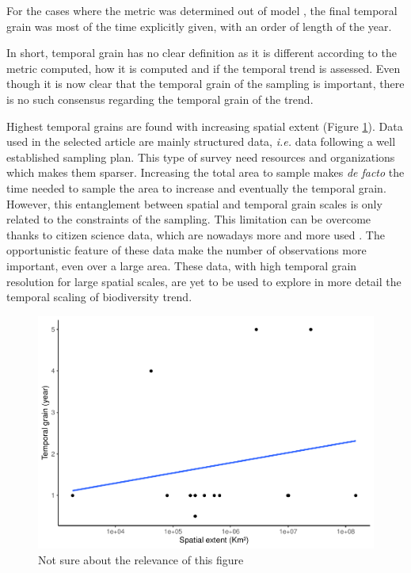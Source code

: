 \documentclass[
  12pt,
  oneside]{report}
\begin{document}
For the cases where the metric was determined out of model \autocite[e.g.][]{harrison_assessing_2014}, the final temporal grain was most of the time explicitly given, with an order of length of the year.

In short, temporal grain has no clear definition as it is different according to the metric computed, how it is computed and if the temporal trend is assessed. Even though it is now clear that the temporal grain of the sampling is important, there is no such consensus regarding the temporal grain of the trend.

Highest temporal grains are found with increasing spatial extent (Figure \ref{fig:spacetimegrain}). Data used in the selected article are mainly structured data, \emph{i.e.} data following a well established sampling plan. This type of survey need resources and organizations which makes them sparser. Increasing the total area to sample makes \emph{de facto} the time needed to sample the area to increase and eventually the temporal grain. However, this entanglement between spatial and temporal grain scales is only related to the constraints of the sampling. This limitation can be overcome thanks to citizen science data, which are nowadays more and more used \autocites[\emph{e.g.}][]{bowler_winners_2021,isaac_data_2020,isaac_statistics_2014}. The opportunistic feature of these data make the number of observations more important, even over a large area. These data, with high temporal grain resolution for large spatial scales, are yet to be used to explore in more detail the temporal scaling of biodiversity trend.

\begin{figure}
\centering
\includegraphics{literature_review_files/figure-latex/spacetimegrain-1.pdf}
\caption{\label{fig:spacetimegrain}Not sure about the relevance of this figure}
\end{figure}
\end{document}
